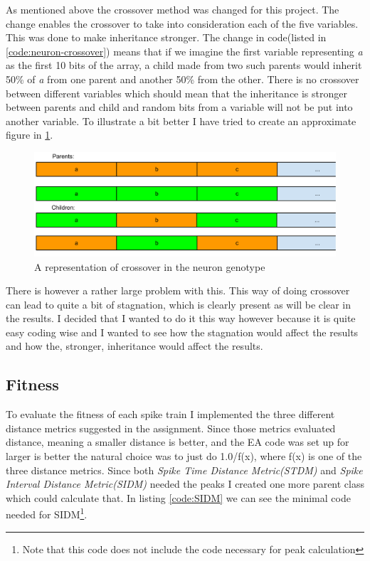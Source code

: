 As mentioned above the crossover method was changed for this project. The change
enables the crossover to take into consideration each of the five variables.
This was done to make inheritance stronger. The change in code(listed in
\ref{code:neuron-crossover}) means that if we imagine the first variable
representing \textit{a} as the first 10 bits of the array, a child made from two
such parents would inherit 50\% of \textit{a} from one parent and another 50\%
from the other. There is no crossover between different variables which should
mean that the inheritance is stronger between parents and child and random bits
from a variable will not be put into another variable. To illustrate a bit
better I have tried to create an approximate figure in
\ref{fig:neuron-crossover}.

\begin{figure}[h]
	\centering
	\includegraphics[scale=0.5]{crossover.pdf}
	\caption{A representation of crossover in the neuron genotype}
	\label{fig:neuron-crossover}
\end{figure}

There is however a rather large problem with this. This way of doing crossover
can lead to quite a bit of stagnation, which is clearly present as will be
clear in the results. I decided that I wanted to do it this way however because
it is quite easy coding wise and I wanted to see how the stagnation would affect
the results and how the, stronger, inheritance would affect the results.

\subsection{Fitness}\label{sec:fitness-description}
To evaluate the fitness of each spike train I implemented the three different
distance metrics suggested in the assignment. Since those metrics evaluated
distance, meaning a smaller distance is better, and the EA code was set up for
larger is better the natural choice was to just do 1.0/f(x), where f(x) is one of
the three distance metrics. Since both \textit{Spike Time Distance Metric(STDM)}
and \textit{Spike Interval Distance Metric(SIDM)} needed the peaks I created one
more parent class which could calculate that. In listing \ref{code:SIDM} we can
see the minimal code needed for SIDM\footnote{Note that this code does not
include the code necessary for peak calculation}.


